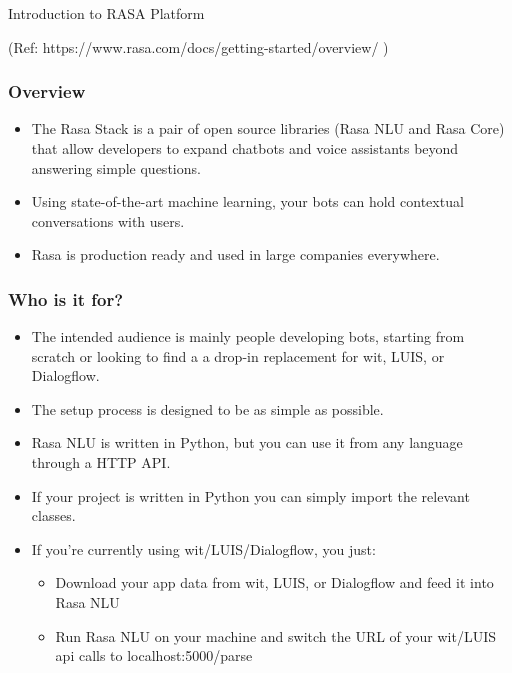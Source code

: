 \begin{frame}[fragile]\frametitle{}
\begin{center}
{\Large Introduction to RASA Platform}

{\tiny (Ref: https://www.rasa.com/docs/getting-started/overview/ )}
\end{center}
\end{frame}

 \begin{frame}[fragile]\frametitle{Overview}
\begin{itemize}
\item The Rasa Stack is a pair of open source libraries (Rasa NLU and Rasa Core) that allow developers to expand chatbots and voice assistants beyond answering simple questions. 
\item Using state-of-the-art machine learning, your bots can hold contextual conversations with users. 
\item Rasa is production ready and used in large companies everywhere.
\end{itemize}
\end{frame}



 \begin{frame}[fragile]\frametitle{Who is it for?}
\begin{itemize}
\item The intended audience is mainly people developing bots, starting from scratch or looking to find a a drop-in replacement for wit, LUIS, or Dialogflow. 
\item The setup process is designed to be as simple as possible. 
\item Rasa NLU is written in Python, but you can use it from any language through a HTTP API. 
\item If your project is written in Python you can simply import the relevant classes. 
\item If you're currently using wit/LUIS/Dialogflow, you just:
\begin{itemize}
\item Download your app data from wit, LUIS, or Dialogflow and feed it into Rasa NLU
\item Run Rasa NLU on your machine and switch the URL of your wit/LUIS api calls to localhost:5000/parse
\end{itemize}
\end{itemize}
\end{frame}


